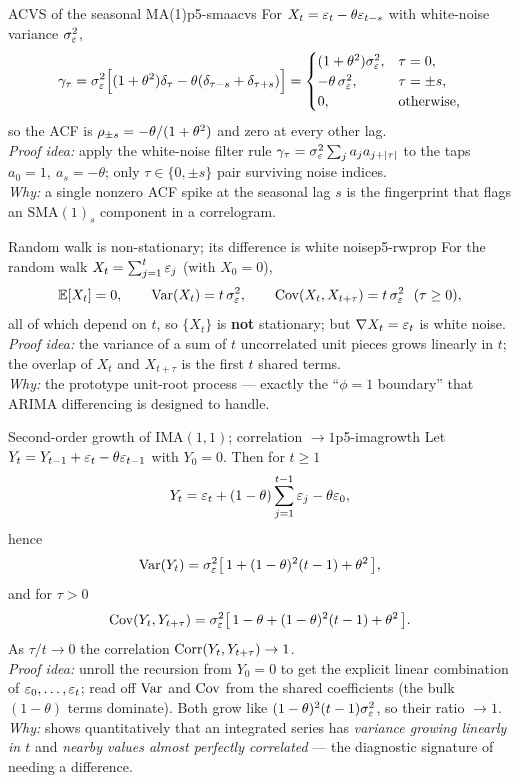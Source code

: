 \begin{proposition}{ACVS of the seasonal MA(1)}{p5-smaacvs}
For $X_t=\varepsilon_t-\theta\varepsilon_{t-s}$ with white-noise variance $\sigma_\varepsilon^2$,
\[
\gamma_\tau=\sigma_\varepsilon^2\Bigl[(1+\theta^{2})\delta_\tau-\theta(\delta_{\tau-s}+\delta_{\tau+s})\Bigr]
=\begin{cases}
(1+\theta^{2})\sigma_\varepsilon^2, & \tau=0,\\
-\theta\,\sigma_\varepsilon^2, & \tau=\pm s,\\
0, &\text{otherwise,}
\end{cases}
\]
so the ACF is $\rho_{\pm s}=-\theta/(1+\theta^{2})$ and zero at every other lag.\\[2pt]
\textit{Proof idea:} apply the white-noise filter rule
$\gamma_\tau=\sigma_\varepsilon^2\sum_j a_j a_{j+\left\lvert \tau \right\rvert}$ to the taps
$a_0=1,\ a_s=-\theta$; only $\tau\in\{0,\pm s\}$ pair surviving noise indices.\\
\textit{Why:} a single nonzero ACF spike at the seasonal lag $s$ is the
fingerprint that flags an $\mathrm{SMA}(1)_s$ component in a correlogram.
\end{proposition}

\begin{proposition}{Random walk is non-stationary; its difference is white noise}{p5-rwprop}
For the random walk $X_t=\sum_{j=1}^{t}\varepsilon_j$ (with $X_0=0$),
\[
\mathbb{E}[X_t]=0,\qquad \operatorname{Var}(X_t)=t\,\sigma_\varepsilon^2,\qquad
\operatorname{Cov}(X_t,X_{t+\tau})=t\,\sigma_\varepsilon^2\ \ (\tau\ge0),
\]
all of which depend on $t$, so $\{X_t\}$ is \textbf{not} stationary; but
$\nabla X_t=\varepsilon_t$ is white noise.\\[2pt]
\textit{Proof idea:} the variance of a sum of $t$ uncorrelated unit pieces grows
linearly in $t$; the overlap of $X_t$ and $X_{t+\tau}$ is the first $t$ shared
terms.\\
\textit{Why:} the prototype unit-root process --- exactly the ``$\phi=1$
boundary'' that ARIMA differencing is designed to handle.
\end{proposition}

\begin{theorem}{Second-order growth of IMA$(1,1)$; correlation $\to 1$}{p5-imagrowth}
Let $Y_t=Y_{t-1}+\varepsilon_t-\theta\varepsilon_{t-1}$ with $Y_0=0$. Then for $t\ge1$
\[
Y_t=\varepsilon_t+(1-\theta)\sum_{j=1}^{t-1}\varepsilon_j-\theta\varepsilon_0 ,
\]
hence
\[
\operatorname{Var}(Y_t)=\sigma_\varepsilon^2\bigl[\,1+(1-\theta)^{2}(t-1)+\theta^{2}\,\bigr],
\]
and for $\tau>0$
\[
\operatorname{Cov}(Y_t,Y_{t+\tau})=\sigma_\varepsilon^2\bigl[\,1-\theta+(1-\theta)^{2}(t-1)+\theta^{2}\,\bigr].
\]
As $\tau/t\to0$ the correlation $\operatorname{Corr}(Y_t,Y_{t+\tau})\to1$.\\[2pt]
\textit{Proof idea:} unroll the recursion from $Y_0=0$ to get the explicit
linear combination of $\varepsilon_0,\dots,\varepsilon_t$; read off $\operatorname{Var}$ and $\operatorname{Cov}$ from the
shared coefficients (the bulk $(1-\theta)$ terms dominate). Both grow like
$(1-\theta)^2(t-1)\sigma_\varepsilon^2$, so their ratio $\to1$.\\
\textit{Why:} shows quantitatively that an integrated series has
\emph{variance growing linearly in $t$} and \emph{nearby values almost perfectly
correlated} --- the diagnostic signature of needing a difference.
\end{theorem}

